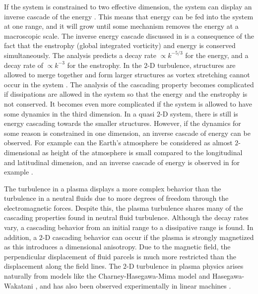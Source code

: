 If the system is constrained to two effective dimension, the system can display an inverse cascade of the energy \cite{Kraichan1980}.
This means that energy can be fed into the system at one range, and it will grow until some mechanism removes the energy at a macroscopic scale.
The inverse energy cascade discussed in \cite{Kraichan1980} is a consequence of the fact that the enstrophy (global integrated vorticity) and energy is conserved simultaneously.
The analysis predicts a decay rate $\propto k^{-5/3}$ for the energy, and a decay rate of $\propto k^{-3}$ for the enstrophy.
In the $2$-D turbulence, structures are allowed to merge together and form larger structures as vortex stretching cannot occur in the system \cite{Fjortoft1953}.
The analysis of the cascading property becomes complicated if dissipations are allowed in the system so that the energy and the enstrophy is not conserved.
It becomes even more complicated if the system is allowed to have some dynamics in the third dimension.
In a quasi $2$-D system, there is still is energy cascading towards the smaller structures.
However, if the dynamics for some reason is constrained in one dimension, an inverse cascade of energy can be observed.
For example can the Earth's atmosphere be considered as almost $2$-dimensional as height of the atmosphere is small compared to the longitudinal and latitudinal dimension, and an inverse cascade of energy is observed in for example \cite{Smith2002}.

The turbulence in a plasma displays a more complex behavior than the turbulence in a neutral fluids due to more degrees of freedom through the electromagnetic forces.
Despite this, the plasma turbulence shares many of the cascading properties found in neutral fluid turbulence.
Although the decay rates vary, a cascading behavior from an initial range to a dissipative range is found.
In addition, a $2$-D cascading behavior can occur if the plasma is strongly magnetized as this introduces a dimensional anisotropy.
Due to the magnetic field, the perpendicular displacement of fluid parcels is much more restricted than the displacement along the field lines.
The $2$-D turbulence in plasma physics arises naturally from models like the Charney-Hasegawa-Mima model \cite{Boffetta2002} and Hasegawa-Wakatani \cite{Manz2009}, and has also been observed experimentally in linear machines \cite{Tynan2006a}.

